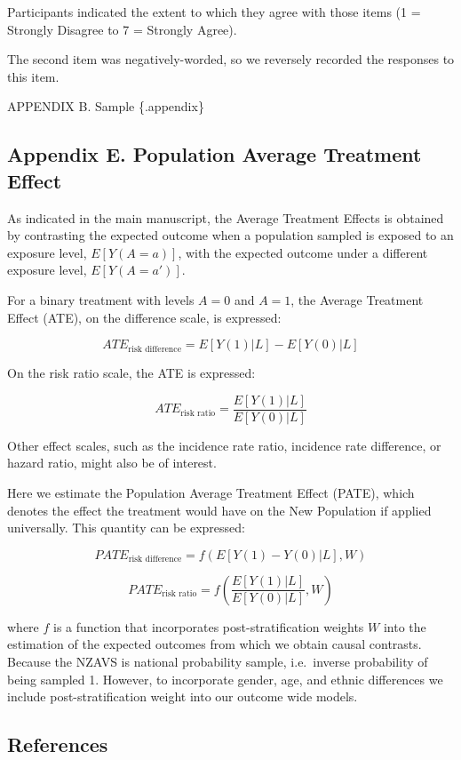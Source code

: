 \documentclass[
  singlecolumn,
  9pt]{article}
\begin{document}
Participants indicated the extent to which they agree with those items
(1 = Strongly Disagree to 7 = Strongly Agree).

The second item was negatively-worded, so we reversely recorded the
responses to this item.

\newpage{}

APPENDIX B. Sample \{.appendix\}

\newpage{}

\subsection{Appendix E. Population Average Treatment
Effect}\label{appendix-e.-population-average-treatment-effect}

As indicated in the main manuscript, the Average Treatment Effects is
obtained by contrasting the expected outcome when a population sampled
is exposed to an exposure level, \(E[Y(A = a)]\), with the expected
outcome under a different exposure level, \(E[Y(A=a')]\).

For a binary treatment with levels \(A=0\) and \(A=1\), the Average
Treatment Effect (ATE), on the difference scale, is expressed:

\[ATE_{\text{risk difference}} = E[Y(1)|L] - E[Y(0)|L]\]

On the risk ratio scale, the ATE is expressed:

\[ATE_{\text{risk ratio}} = \frac{E[Y(1)|L]}{E[Y(0)|L]}\]

Other effect scales, such as the incidence rate ratio, incidence rate
difference, or hazard ratio, might also be of interest.

Here we estimate the Population Average Treatment Effect (PATE), which
denotes the effect the treatment would have on the New Population if
applied universally. This quantity can be expressed:

\[PATE_{\text{risk difference}} = f(E[Y(1) - Y(0)|L], W)\]

\[PATE_{\text{risk ratio}} = f\left(\frac{E[Y(1)|L]}{E[Y(0)|L]}, W\right)\]

where \(f\) is a function that incorporates post-stratification weights
\(W\) into the estimation of the expected outcomes from which we obtain
causal contrasts. Because the NZAVS is national probability sample,
i.e.~inverse probability of being sampled 1. However, to incorporate
gender, age, and ethnic differences we include post-stratification
weight into our outcome wide models.

\subsection*{References}\label{references}
\end{document}
